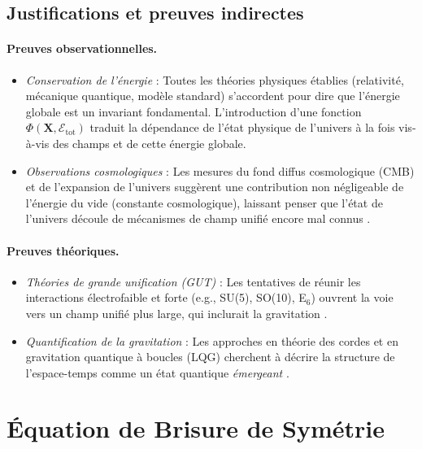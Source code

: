 \documentclass[12pt]{article}
\begin{document}
\subsection{Justifications et preuves indirectes}

\paragraph{Preuves observationnelles.}
\begin{itemize}
    \item \emph{Conservation de l'énergie} : Toutes les théories physiques établies (relativité, 
    mécanique quantique, modèle standard) s'accordent pour dire que l'énergie globale est un 
    invariant fondamental. L'introduction d'une fonction $\Phi(\mathbf{X}, \mathcal{E}_{\mathrm{tot}})$ 
    traduit la dépendance de l'état physique de l'univers à la fois vis-à-vis des champs et 
    de cette énergie globale.
    \item \emph{Observations cosmologiques} : Les mesures du fond diffus cosmologique (CMB) 
    et de l'expansion de l'univers suggèrent une contribution non négligeable de l'énergie 
    du vide (constante cosmologique), laissant penser que l'état de l'univers découle 
    de mécanismes de champ unifié encore mal connus \cite{planck2020parameters}.
\end{itemize}

\paragraph{Preuves théoriques.}
\begin{itemize}
    \item \emph{Théories de grande unification (GUT)} : Les tentatives de réunir les 
    interactions électrofaible et forte (e.g., SU(5), SO(10), E$_6$) ouvrent la voie 
    vers un champ unifié plus large, qui inclurait la gravitation \cite{georgi1974unified}.
    \item \emph{Quantification de la gravitation} : Les approches en théorie des cordes 
    et en gravitation quantique à boucles (LQG) cherchent à décrire la structure 
    de l'espace-temps comme un état quantique \emph{émergeant} \cite{rovelli2004quantum, polchinski1998string}.
\end{itemize}

\section{Équation de Brisure de Symétrie}
\end{document}
